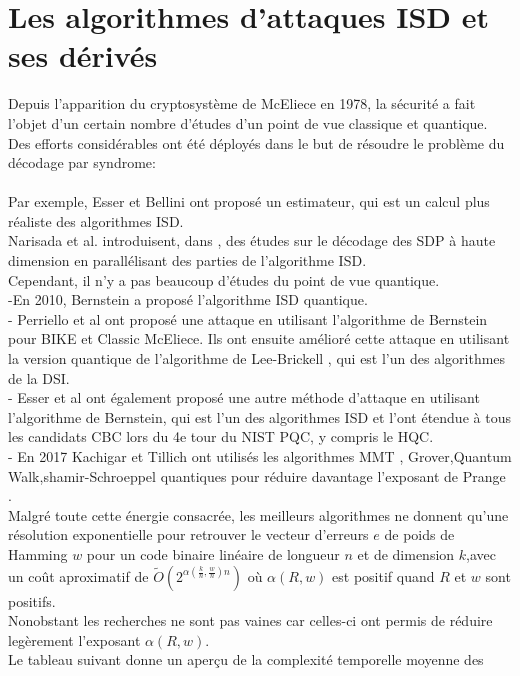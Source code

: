 \documentclass[12pt,openany]{report}
\begin{document}
\section{Les algorithmes d'attaques ISD et ses dérivés}
 Depuis l'apparition du cryptosystème de McEliece en 1978, la sécurité a fait l'objet d'un certain nombre d'études d'un point de vue classique et quantique. Des efforts considérables ont été déployés dans le but de résoudre le problème du décodage par syndrome:\\
  \\Par exemple, Esser et Bellini \cite{Belestr5} ont proposé un estimateur, qui est un calcul plus réaliste des algorithmes ISD. \\ Narisada et al. introduisent, dans \cite{Narisada15}, des études sur le décodage des SDP à haute dimension en parallélisant des parties de l'algorithme ISD.\\
Cependant, il n'y a pas beaucoup d'études du point de vue quantique.\\
-En 2010, Bernstein \cite{Bergrover3} a proposé l'algorithme ISD quantique.\\
- Perriello et al \cite{Perriello18} ont proposé une attaque en utilisant l'algorithme de Bernstein pour BIKE et Classic McEliece.
 Ils ont ensuite amélioré cette attaque en utilisant la version quantique de l'algorithme de Lee-Brickell \cite{Leebr10}, qui est l'un des algorithmes de la DSI.\\
 - Esser et al \cite{Essramos6} ont également proposé une autre méthode d'attaque en utilisant l'algorithme de Bernstein, qui est l'un des algorithmes ISD et l'ont étendue à tous les candidats CBC lors du 4e tour du NIST PQC, y compris le HQC.\\
 - En 2017  Kachigar et Tillich \cite{Kati9} ont utilisés les algorithmes MMT \cite{Mmt11}, Grover,Quantum Walk,shamir-Schroeppel quantiques pour réduire davantage l'exposant de Prange .\\
 Malgré toute cette énergie consacrée, les meilleurs algorithmes ne donnent qu'une résolution exponentielle pour retrouver le vecteur d'erreurs $e$ de poids de Hamming $w$ pour un code binaire linéaire de longueur $n$ et de dimension $k$,avec un coût aproximatif  de $ \tilde{O}\left( 2^{\alpha\left( \frac{k}{n},\frac{w}{n} \right)n } \right) $ où $\alpha\left( \mathit{R},w\right)$ est positif quand $\mathit{R}$ et $w$ sont positifs.\\Nonobstant les recherches ne sont pas vaines car celles-ci ont permis de réduire legèrement l'exposant $\alpha\left( \mathit{R},w\right)$.\\Le tableau suivant donne un aperçu de la complexité temporelle moyenne des
\end{document}

